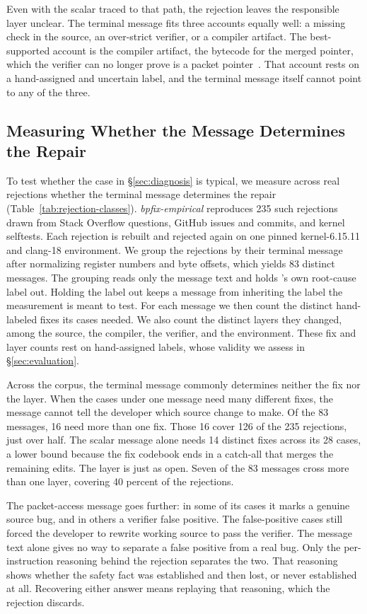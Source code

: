 Even with the scalar traced to that path, the rejection leaves the responsible layer unclear. The terminal message fits three accounts equally well: a missing check in the source, an over-strict verifier, or a compiler artifact. The best-supported account is the compiler artifact, the bytecode for the merged pointer, which the verifier can no longer prove is a packet pointer~\cite{alden2024llvm}. That account rests on a hand-assigned and uncertain label, and the terminal message itself cannot point to any of the three.

\subsection{Measuring Whether the Message Determines the Repair}

To test whether the case in \S\ref{sec:diagnosis} is typical, we measure across real rejections whether the terminal message determines the repair (Table~\ref{tab:rejection-classes}). \emph{bpfix-empirical} reproduces 235 such rejections drawn from Stack Overflow questions, GitHub issues and commits, and kernel selftests. Each rejection is rebuilt and rejected again on one pinned kernel-6.15.11 and clang-18 environment. We group the rejections by their terminal message after normalizing register numbers and byte offsets, which yields 83 distinct messages. The grouping reads only the message text and holds \sys's own root-cause label out. Holding the label out keeps a message from inheriting the label the measurement is meant to test. For each message we then count the distinct hand-labeled fixes its cases needed. We also count the distinct layers they changed, among the source, the compiler, the verifier, and the environment. These fix and layer counts rest on hand-assigned labels, whose validity we assess in \S\ref{sec:evaluation}.

 Across the corpus, the terminal message commonly determines neither the fix nor the layer. When the cases under one message need many different fixes, the message cannot tell the developer which source change to make. Of the 83 messages, 16 need more than one fix. Those 16 cover 126 of the 235 rejections, just over half. The scalar message alone needs 14 distinct fixes across its 28 cases, a lower bound because the fix codebook ends in a catch-all that merges the remaining edits. The layer is just as open. Seven of the 83 messages cross more than one layer, covering 40 percent of the rejections.

The packet-access message goes further: in some of its cases it marks a genuine source bug, and in others a verifier false positive. The false-positive cases still forced the developer to rewrite working source to pass the verifier. The message text alone gives no way to separate a false positive from a real bug. Only the per-instruction reasoning behind the rejection separates the two. That reasoning shows whether the safety fact was established and then lost, or never established at all. Recovering either answer means replaying that reasoning, which the rejection discards.

